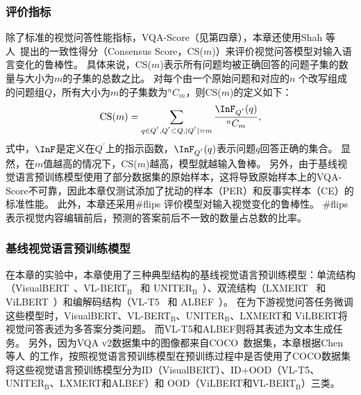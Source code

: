 



\subsubsection{评价指标}
除了标准的视觉问答性能指标，VQA-Score（见第四章），本章还使用Shah 等人~\cite{shah2019cycle}提出的一致性得分（Consensus Score，CS($m$)）来评价视觉问答模型对输入语言变化的鲁棒性。
具体来说，CS($m$)表示所有问题均被正确回答的问题子集的数量与大小为$m$的子集的总数之比。
对每个由一个原始问题和对应的$n$ 个改写组成的问题组$Q$，所有大小为$m$的子集数为$^{n}C_{m}$，则CS($m$)的定义如下：
\begin{equation}
\begin{aligned}
\mathrm{CS}(m) = \sum_{q\in Q^{'}, Q^{'} \subset Q, |Q^{'}|=m} \frac{\InF_{Q^{'}}(q)}{^{n}C_{m}},  
\end{aligned}
\end{equation}
式中，$\InF$是定义在$Q^{'}$上的指示函数，$\InF_{Q^{'}}(q)$表示问题$q$回答正确的集合。
显然，在$m$值越高的情况下，CS($m$)越高，模型就越输入鲁棒。
另外，由于基线视觉语言预训练模型使用了部分数据集的原始样本，这将导致原始样本上的VQA-Score不可靠，因此本章仅测试添加了扰动的样本（PER）和反事实样本（CE）的标准性能。
此外，本章还采用\#flips \cite{agarwal2020towards}评价模型对输入视觉变化的鲁棒性。
\#flips表示视觉内容编辑前后，预测的答案前后不一致的数量占总数的比率。


\subsubsection{基线视觉语言预训练模型}
在本章的实验中，本章使用了三种典型结构的基线视觉语言预训练模型：单流结构（VisualBERT~\cite{li2019visualbert}、VL-BERT$_{\text{B}}$~\cite{su2019vl} 和 UNITER$_{\text{B}}$~\cite{chen2020uniter}）、双流结构（LXMERT~\cite{tan2019lxmert} 和 ViLBERT~\cite{lu2019vilbert}）和编解码结构（VL-T5~\cite{cho2021unifying} 和 ALBEF~\cite{li2021align}）。
在为下游视觉问答任务微调这些模型时，VisualBERT、VL-BERT$_{\text{B}}$、UNITER$_{\text{B}}$、LXMERT和 ViLBERT将视觉问答表述为多答案分类问题。
而VL-T5和ALBEF则将其表述为文本生成任务。
另外，因为VQA v2数据集中的图像都来自COCO~\cite{chen2015microsoft}数据集，本章根据Chen 等人~\cite{chen2020uniter}的工作，按照视觉语言预训练模型在预训练过程中是否使用了COCO数据集将这些视觉语言预训练模型分为ID（VisualBERT）、ID+OOD（VL-T5、UNITER$_{\text{B}}$、LXMERT和ALBEF）和 OOD（ViLBERT和VL-BERT$_{\text{B}}$）三类。








